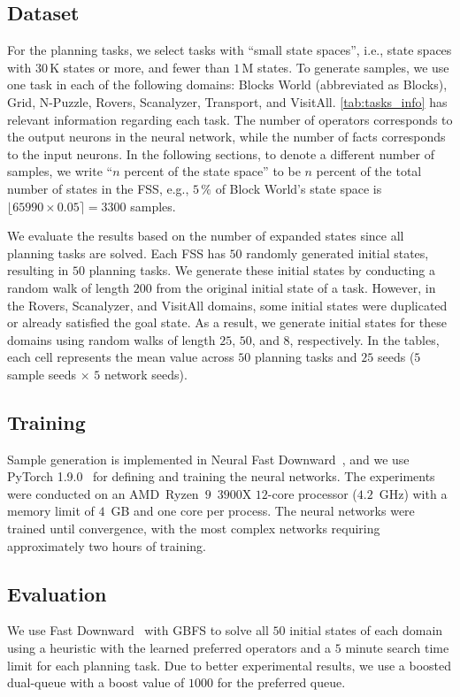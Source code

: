 \documentclass[ppgc,diss,english]{iiufrgs}
\begin{document}
\subsection{Dataset}
\label{sec:exp-dataset}
For the planning tasks, we select tasks with ``small state spaces'', i.e., state spaces with $30$\,K states or more, and fewer than $1$\,M states. To generate samples, we use one task in each of the following domains: Blocks World (abbreviated as Blocks), Grid, N-Puzzle, Rovers, Scanalyzer, Transport, and VisitAll. \cref{tab:tasks_info} has relevant information regarding each task. The number of operators corresponds to the output neurons in the neural network, while the number of facts corresponds to the input neurons. In the following sections, to denote a different number of samples, we write ``$n$ percent of the state space'' to be $n$ percent of the total number of states in the FSS, e.g., $5\,\%$ of Block World's state space is $\lfloor 65990 \times 0.05 \rceil = 3300$ samples.

We evaluate the results based on the number of expanded states since all planning tasks are solved. Each FSS has $50$ randomly generated initial states, resulting in $50$ planning tasks. We generate these initial states by conducting a random walk of length $200$ from the original initial state of a task. However, in the Rovers, Scanalyzer, and VisitAll domains, some initial states were duplicated or already satisfied the goal state. As a result, we generate initial states for these domains using random walks of length $25$, $50$, and $8$, respectively.
In the tables, each cell represents the mean value across $50$ planning tasks and $25$ seeds ($5$ sample seeds $\times$ $5$ network seeds).



\subsection{Training}
\label{sec:exp-training}
Sample generation is implemented in Neural Fast Downward~\cite{Ferber.etal/2020a}, and we use PyTorch 1.9.0~\cite{Paszke/2019} for defining and training the neural networks. The experiments were conducted on an AMD~Ryzen~$9$~$3900$X $12$-core processor ($4.2$~GHz) with a memory limit of $4$~GB and one core per process. The neural networks were trained until convergence, with the most complex networks requiring approximately two hours of training.

\subsection{Evaluation}
\label{sec:exp-evaluation}
We use Fast Downward~\cite{Helmert/2006} with GBFS to solve all $50$ initial states of each domain using a heuristic with the learned preferred operators and a $5$ minute search time limit for each planning task. Due to better experimental results, we use a boosted dual-queue with a boost value of $1000$ for the preferred queue.
\end{document}
